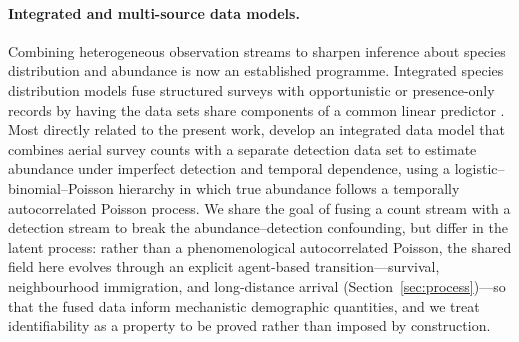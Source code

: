 \documentclass[preprint,12pt]{elsarticle}
\theoremstyle{definition}
\begin{document}
\paragraph{Integrated and multi-source data models.}
Combining heterogeneous observation streams to sharpen inference about
species distribution and abundance is now an established programme.
Integrated species distribution models fuse structured surveys with
opportunistic or presence-only records by having the data sets share
components of a common linear predictor \citep{isaac2020}. Most directly
related to the present work, \citet{verhoef2025} develop an integrated data
model that combines aerial survey counts with a separate detection data set
to estimate abundance under imperfect detection and temporal dependence,
using a logistic--binomial--Poisson hierarchy in which true abundance
follows a temporally autocorrelated Poisson process. We share the goal of
fusing a count stream with a detection stream to break the
abundance--detection confounding, but differ in the latent process: rather
than a phenomenological autocorrelated Poisson, the shared field here evolves
through an explicit agent-based transition---survival, neighbourhood
immigration, and long-distance arrival (Section~\ref{sec:process})---so that
the fused data inform mechanistic demographic quantities, and we treat
identifiability as a property to be proved rather than imposed by
construction.
\end{document}
